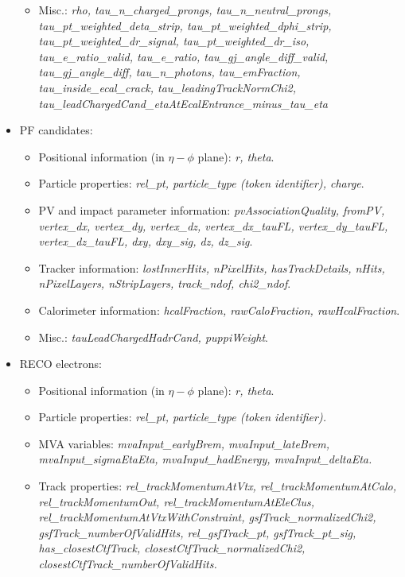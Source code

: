 \begin{itemize}
\begin{itemize}
		\item Misc.: \textit{rho, tau\_n\_charged\_prongs, tau\_n\_neutral\_prongs, 
		 tau\_pt\_weighted\_deta\_strip, tau\_pt\_weighted\_dphi\_strip, tau\_pt\_weighted\_dr\_signal, tau\_pt\_weighted\_dr\_iso, tau\_e\_ratio\_valid, tau\_e\_ratio, tau\_gj\_angle\_diff\_valid, tau\_gj\_angle\_diff, tau\_n\_photons, tau\_emFraction, tau\_inside\_ecal\_crack, tau\_leadingTrackNormChi2, tau\_leadChargedCand\_etaAtEcalEntrance\_minus\_tau\_eta}
	\end{itemize}
	\item PF candidates:
	\begin{itemize}
		\item Positional information (in $\eta-\phi$ plane): \textit{r, theta}.
		\item Particle properties: \textit{rel\_pt, particle\_type (token identifier), charge}.
		\item PV and impact parameter information: \textit{pvAssociationQuality, fromPV, vertex\_dx, vertex\_dy, vertex\_dz, vertex\_dx\_tauFL, vertex\_dy\_tauFL, vertex\_dz\_tauFL,  dxy, dxy\_sig, dz, dz\_sig}. 
		\item Tracker information:  \textit{lostInnerHits, nPixelHits, hasTrackDetails, nHits, nPixelLayers, nStripLayers, track\_ndof, chi2\_ndof}.
		\item  Calorimeter information: \textit{hcalFraction, rawCaloFraction, rawHcalFraction}. 
		\item Misc.: \textit{tauLeadChargedHadrCand, puppiWeight}.
	\end{itemize}
	\item RECO electrons:
	\begin{itemize}
		\item Positional information (in $\eta-\phi$ plane): \textit{r, theta}.
		\item Particle properties: \textit{rel\_pt, particle\_type (token identifier).}
		
		\item MVA variables: \textit{mvaInput\_earlyBrem, mvaInput\_lateBrem, mvaInput\_sigmaEtaEta, mvaInput\_hadEnergy, mvaInput\_deltaEta.}
		
		\item Track properties: \textit{rel\_trackMomentumAtVtx, rel\_trackMomentumAtCalo, rel\_trackMomentumOut, rel\_trackMomentumAtEleClus, rel\_trackMomentumAtVtxWithConstraint, gsfTrack\_normalizedChi2, gsfTrack\_numberOfValidHits, rel\_gsfTrack\_pt, gsfTrack\_pt\_sig, has\_closestCtfTrack, closestCtfTrack\_normalizedChi2, closestCtfTrack\_numberOfValidHits.}
		

\end{itemize}
\end{itemize}
